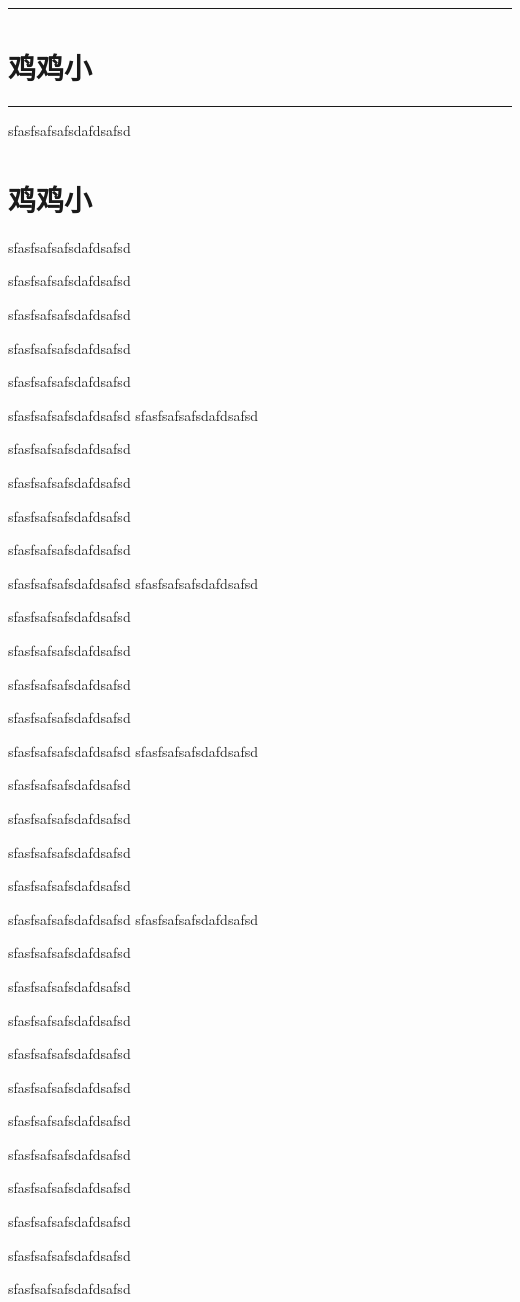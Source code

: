 \documentclass[hyperref,UTF8]{ctexrep}
\newenvironment{thisBody}
	{
		\zihao{3}
	}%
	{
		\clearpage
	}%
\begin{document}
\noindent\rule[0.5ex]{\columnwidth}{0.6pt}
\section{鸡鸡小}





\noindent\rule[0.5ex]{\columnwidth}{0.6pt}

	\begin{thisBody} 
		sfasfsafsafsdafdsafsd
	\end{thisBody}
\section{鸡鸡小}
	\begin{thisBody}
		
		
		
			sfasfsafsafsdafdsafsd
		
		sfasfsafsafsdafdsafsd
		
		sfasfsafsafsdafdsafsd
		
		sfasfsafsafsdafdsafsd
		
		sfasfsafsafsdafdsafsd
		
		
		sfasfsafsafsdafdsafsd
			sfasfsafsafsdafdsafsd
		
		sfasfsafsafsdafdsafsd
		
		sfasfsafsafsdafdsafsd
		
		sfasfsafsafsdafdsafsd
		
		sfasfsafsafsdafdsafsd
		
		
		sfasfsafsafsdafdsafsd
			sfasfsafsafsdafdsafsd
		
		sfasfsafsafsdafdsafsd
		
		sfasfsafsafsdafdsafsd
		
		sfasfsafsafsdafdsafsd
		
		sfasfsafsafsdafdsafsd
		
		
		sfasfsafsafsdafdsafsd
			sfasfsafsafsdafdsafsd
		
		sfasfsafsafsdafdsafsd
		
		sfasfsafsafsdafdsafsd
		
		sfasfsafsafsdafdsafsd
		
		sfasfsafsafsdafdsafsd
		
		
		sfasfsafsafsdafdsafsd
			sfasfsafsafsdafdsafsd
		
		sfasfsafsafsdafdsafsd
		
		sfasfsafsafsdafdsafsd
		
		sfasfsafsafsdafdsafsd
		
		sfasfsafsafsdafdsafsd
		
		
		sfasfsafsafsdafdsafsd
		 
		sfasfsafsafsdafdsafsd
		
			sfasfsafsafsdafdsafsd
			
				sfasfsafsafsdafdsafsd
				
					sfasfsafsafsdafdsafsd
					
						sfasfsafsafsdafdsafsd
						
						
							sfasfsafsafsdafdsafsd
	\end{thisBody}
\end{document}
